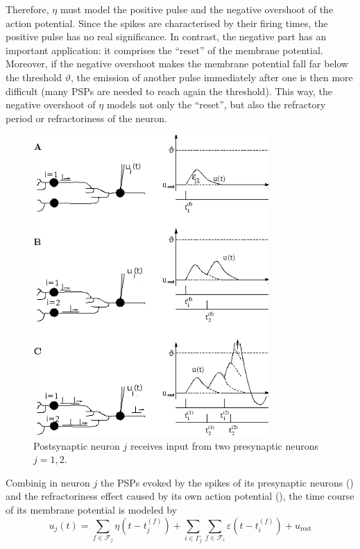 \begin{description}
{Therefore, $\eta$ must model the positive pulse and the negative overshoot of the action potential. Since the spikes are characterised by their firing times, the positive pulse has no real significance. In contrast, the negative part has an important application: it comprises the ``reset'' of the membrane potential. Moreover, if the negative overshoot makes the membrane potential fall far below the threshold $\vartheta$, the emission of another pulse immediately after one is then more difficult (many PSPs are needed to reach again the threshold). This way, the negative overshoot of $\eta$ models not only the ``reset'', but also the refractory period or refractoriness of the neuron.
}

\end{description}

\begin{figure}[!ht]
\centering
\includegraphics[width=0.8\textwidth]{images/srm_dynamics_png.png}
\caption{Postsynaptic neuron $j$ receives input from two presynaptic neurons $j=1,2$.}
\label{fig:srmdynamic}
\end{figure} 

Combinig in neuron $j$ the PSPs evoked by the spikes of its presynaptic neurons () and the refractoriness effect caused by its own action potential (), the time course of its membrane potential is modeled by
\begin{equation}
u_{j}(t)=\sum_{f\in \mathcal{F}_{j}}\eta(t-t_{j}^{(f)})+
\sum_{i\in \Gamma_{j}}\sum_{f\in \mathcal{F}_{i}}
	\varepsilon(t-t_{i}^{(f)})+u_{\text{rest}}
\label{eq:srmuniqueconnection}
\end{equation}


